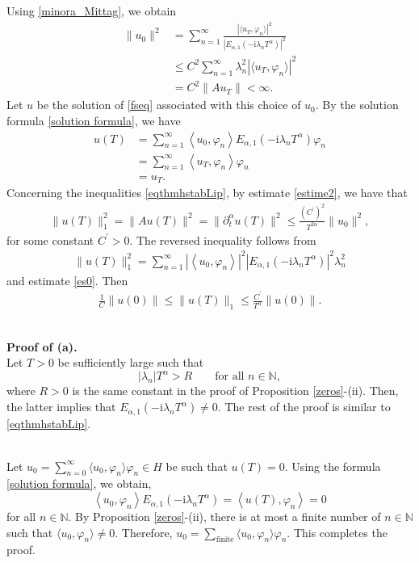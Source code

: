 \documentclass[reqno]{amsart}
\makeatletter
\renewenvironment{proof}[1][\proofname]{\par
  \pushQED{\qed}%
  \normalfont \topsep6\p@\@plus6\p@\relax
  \trivlist
  \item[\hskip\labelsep\bfseries #1\@addpunct{.}]%
}{%
  \popQED\endtrivlist\@endpefalse
}
\numberwithin{equation}{section}
\makeatother
\begin{document}
\begin{proof}
    Using \eqref{minora_Mittag}, we obtain
	\begin{align*}
		\|u_0\|^2 &=\sum_{n=1}^{\infty}\frac{|\langle u_T,\varphi_n\rangle|^2}{|E_{\alpha, 1}\left(-\mathrm{i}\lambda_n T^\alpha\right)|^2}\\
		&\le C^2\sum_{n=1}^{\infty} \lambda_{n}^2|\langle u_T,\varphi_n\rangle|^2	\\
		&=C^2 \|Au_T\|<\infty.
	\end{align*}
	Let $u$ be the solution of \eqref{fseq} associated with this choice of $u_0$. By the solution formula \eqref{solution formula}, we have
	\begin{align*}
		u(T)&=\sum_{n=1}^{\infty}\left\langle u_0, \varphi_n\right\rangle E_{\alpha, 1}\left(-\mathrm{i}\lambda_n T^\alpha\right) \varphi_n\\
		&=\sum_{n=1}^{\infty}\left\langle u_T, \varphi_n\right\rangle \varphi_n\\
		&=u_T.
	\end{align*}
	Concerning the inequalities \eqref{eqthmhstabLip}, by estimate \eqref{estime2}, we have that
	\begin{align*}
		\|u(T)\|^2_{1}=\|Au(T)\|^2=\|\partial_t^\alpha u(T)\|^2\leq \frac{(C^{\prime})^2}{T^{2\alpha}}\|u_{0}\|^2,
	\end{align*}
	for some constant $C^{\prime}>0$. The reversed inequality follows from 
	\begin{align*}
		\|u(T)\|^2_{1}=\sum_{n=1}^{\infty}|\left\langle u_0, \varphi_n\right\rangle |^2|E_{\alpha, 1}\left(-\mathrm{i}\lambda_n T^\alpha\right)|^2\lambda_{n}^2
	\end{align*}
	and estimate \eqref{es0}.
	Then 
	\begin{align*}
		\frac{1}{C}\|u(0)\|\le \|u(T)\|_{1}\leq \frac{C^{\prime}}{T^{\alpha}}\|u(0)\|.
	\end{align*}
\bigskip

\\
{\bf Proof of (a).}\\
Let $T>0$ be sufficiently large such that
$$
\vert \lambda_n \vert T^{\alpha} > R \qquad \text{for all } n\in\mathbb{N},
$$
where $R>0$ is the same constant in the proof of Proposition \ref{zeros}-(ii). Then, the latter implies that $E_{\alpha,1}(-\mathrm{i} \lambda_n T^{\alpha}) \ne 0$. The rest of the proof is similar to \eqref{eqthmhstabLip}.
\smallskip

\\
Let $u_0 =\displaystyle \sum_{n=0}^\infty \langle u_0,\varphi_n\rangle \varphi_n\in H$ be such that $u(T) = 0$. Using the formula \eqref{solution formula}, we obtain,
\begin{equation*}
    \left\langle u_0, \varphi_n\right\rangle E_{\alpha, 1}\left(-\mathrm{i}\lambda_n T^\alpha\right)=\left\langle u(T), \varphi_n\right\rangle=0
\end{equation*}
for all $n \in \mathbb{N}$. By Proposition \ref{zeros}-(ii), there is at most a finite number of $n\in \mathbb{N}$ such that $\langle u_0,\varphi_n\rangle\neq 0$. Therefore, $u_0 =\displaystyle \sum_{\text{finite}} \langle u_0,\varphi_n\rangle \varphi_n$. This completes the proof.
\end{proof}
\end{document}
